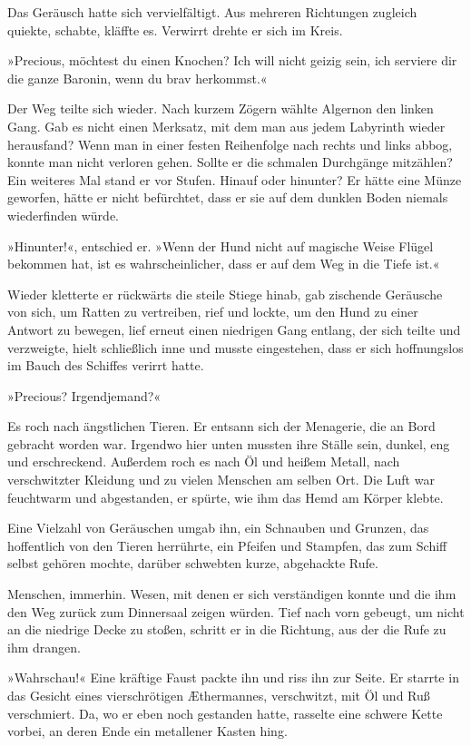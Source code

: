 Das Geräusch hatte sich vervielfältigt. Aus mehreren Richtungen
zugleich quiekte, schabte, kläffte es. Verwirrt drehte er sich im
Kreis.

»Precious, möchtest du einen Knochen? Ich will nicht geizig sein,
ich serviere dir die ganze Baronin, wenn du brav herkommst.«

Der Weg teilte sich wieder. Nach kurzem Zögern wählte Algernon den
linken Gang. Gab es nicht einen Merksatz, mit dem man aus jedem
Labyrinth wieder herausfand? Wenn man in einer festen Reihenfolge
nach rechts und links abbog, konnte man nicht verloren gehen.
Sollte er die schmalen Durchgänge mitzählen? Ein weiteres Mal stand
er vor Stufen. Hinauf oder hinunter? Er hätte eine Münze geworfen,
hätte er nicht befürchtet, dass er sie auf dem dunklen Boden
niemals wiederfinden würde.

»Hinunter!«, entschied er. »Wenn der Hund nicht auf magische Weise
Flügel bekommen hat, ist es wahrscheinlicher, dass er auf dem Weg
in die Tiefe ist.«

Wieder kletterte er rückwärts die steile Stiege hinab, gab
zischende Geräusche von sich, um Ratten zu vertreiben, rief und
lockte, um den Hund zu einer Antwort zu bewegen, lief erneut einen
niedrigen Gang entlang, der sich teilte und verzweigte, hielt
schließlich inne und musste eingestehen, dass er sich hoffnungslos
im Bauch des Schiffes verirrt hatte.

»Precious? Irgendjemand?«

Es roch nach ängstlichen Tieren. Er entsann sich der Menagerie, die
an Bord gebracht worden war. Irgendwo hier unten mussten ihre
Ställe sein, dunkel, eng und erschreckend. Außerdem roch es nach Öl
und heißem Metall, nach verschwitzter Kleidung und zu vielen
Menschen am selben Ort. Die Luft war feuchtwarm und abgestanden, er
spürte, wie ihm das Hemd am Körper klebte.

Eine Vielzahl von Geräuschen umgab ihn, ein Schnauben und Grunzen,
das hoffentlich von den Tieren herrührte, ein Pfeifen und Stampfen,
das zum Schiff selbst gehören mochte, darüber schwebten kurze,
abgehackte Rufe.

Menschen, immerhin. Wesen, mit denen er sich verständigen konnte
und die ihm den Weg zurück zum Dinnersaal zeigen würden. Tief nach
vorn gebeugt, um nicht an die niedrige Decke zu stoßen, schritt er
in die Richtung, aus der die Rufe zu ihm drangen.

\bigpar

»Wahrschau!« Eine kräftige Faust packte ihn und riss ihn zur Seite.
Er starrte in das Gesicht eines vierschrötigen Æthermannes,
verschwitzt, mit Öl und Ruß verschmiert. Da, wo er eben noch
gestanden hatte, rasselte eine schwere Kette vorbei, an deren Ende
ein metallener Kasten hing.

